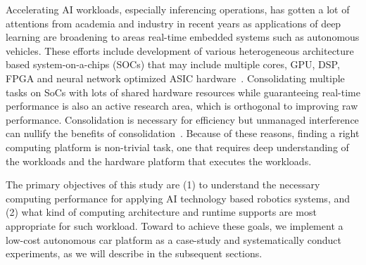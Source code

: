 Accelerating AI workloads, especially inferencing
operations, has gotten a lot of attentions from academia and industry
in recent years as applications of deep learning are broadening to
areas real-time embedded systems such as autonomous vehicles. These
efforts include development of various heterogeneous architecture
based system-on-a-chips (SOCs) that may include multiple cores, GPU,
DSP, FPGA and neural network optimized ASIC hardware~\cite{Jouppi2017}.
Consolidating multiple tasks on SoCs with lots of shared hardware
resources while guaranteeing real-time performance is also an active
research area, which is orthogonal to improving raw
performance. Consolidation is necessary for efficiency but unmanaged 
interference can nullify the benefits of consolidation~\cite{Kim2016}.
Because of these reasons, finding a right computing platform is
non-trivial task, one that requires deep understanding of the
workloads and the hardware platform that executes the workloads.

The primary objectives of this study are (1) to understand the
necessary computing performance for applying AI technology based
robotics systems, and (2) what kind of computing architecture and
runtime supports are most appropriate for such workload. Toward to
achieve these goals, we implement a low-cost autonomous car platform
as a case-study and systematically conduct experiments, as we will 
describe in the subsequent sections.
